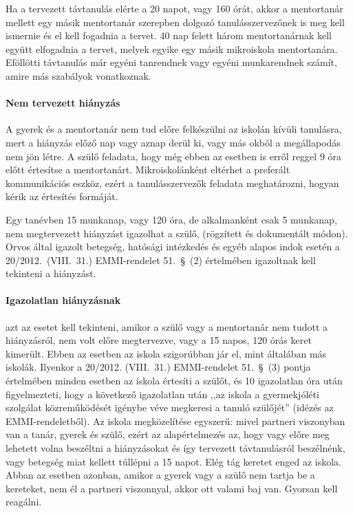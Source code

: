 Ha a tervezett távtanulás elérte a 20 napot, vagy 160 órát, akkor a mentortanár mellett egy másik mentortanár szerepben dolgozó tanulásszervezőnek is meg kell ismernie és el kell fogadnia a tervet. 40 nap felett három mentortanárnak kell együtt elfogadnia a tervet, melyek egyike egy másik mikroiskola mentortanára. Eföllötti távtanulás már egyéni tanrendnek vagy egyéni munkarendnek számít, amire más szabályok vonatkoznak.


\paragraph{Nem tervezett hiányzás} A gyerek és a mentortanár nem tud előre felkészülni az iskolán kívüli tanulásra, mert a hiányzás előző nap vagy aznap derül ki, vagy más okból a megállapodás nem jön létre. A szülő feladata, hogy még ebben az esetben is erről reggel 9 óra előtt értesítse a mentortanárt. Mikroiskolánként eltérhet a preferált kommunikációs eszköz, ezért a tanulásszervezők feladata meghatározni, hogyan kérik az értesítés formáját.

Egy tanévben 15 munkanap, vagy 120 óra, de alkalmanként csak 5 munkanap, nem megtervezett hiányzást igazolhat a szülő, 
(rögzített és dokumentált módon). Orvos által igazolt betegség, hatósági intézkedés és egyéb alapos indok esetén a 20/2012.~(VIII.~31.) EMMI-rendelet 51.~§~(2) értelmében igazoltnak kell tekinteni a hiányzást.

\paragraph{Igazolatlan hiányzásnak} azt az esetet kell tekinteni, amikor a szülő vagy a mentortanár nem tudott a hiányzásról, nem volt előre megtervezve, vagy a 15 napos, 120 órás keret kimerült. Ebben az esetben az iskola szigorúbban jár el, mint általában más iskolák. Ilyenkor a 20/2012. (VIII.~31.) EMMI-rendelet 51.~§~(3) pontja értelmében minden esetben az iskola értesíti a szülőt, és 10 igazolatlan óra után figyelmezteti, hogy a következő igazolatlan után ,,az iskola a gyermekjóléti szolgálat közreműködését igénybe véve megkeresi a tanuló szülőjét'' (idézés az EMMI-rendeletből). Az iskola megközelítése egyszerű: mivel partneri viszonyban van a tanár, gyerek és szülő, ezért az alapértelmezés az, hogy vagy előre meg lehetett volna beszéltni a hiányzásokat és így tervezett távtanulásról beszélnénk, vagy betegség miat kellett túllépni a 15 napot. Elég tág keretet enged az iskola. Abban az esetben azonban, amikor a gyerek vagy a szülő nem tartja be a kereteket, nem él a partneri viszonnyal, akkor ott valami baj van. Gyorsan kell reagálni.

